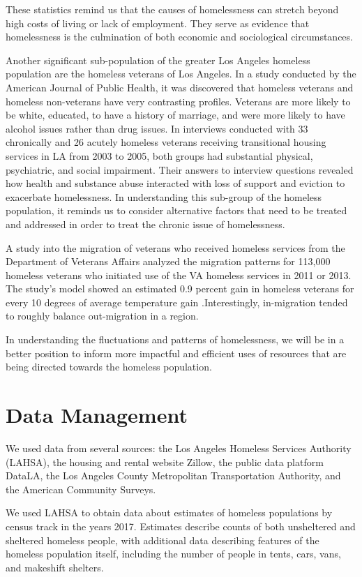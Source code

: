 \documentclass[11pt,letterpaper]{article}
\begin{document}
These statistics remind us that the causes of homelessness can stretch beyond high costs of living or lack of employment. They serve as evidence that homelessness is the culmination of both economic and sociological circumstances.


Another significant sub-population of the greater Los Angeles homeless population are the homeless veterans of Los Angeles. In a study conducted by the American Journal of Public Health, it was discovered that homeless veterans and homeless non-veterans have very contrasting profiles. Veterans are more likely to be white, educated, to have a history of marriage, and were more likely to have alcohol issues rather than drug issues. In interviews conducted with 33 chronically and 26 acutely homeless veterans receiving transitional housing services in LA from 2003 to 2005, both groups had substantial physical, psychiatric, and social impairment. Their answers to interview questions revealed how health and substance abuse interacted with loss of support and eviction to exacerbate homelessness. In understanding this sub-group of the homeless population, it reminds us to consider alternative factors that need to be treated and addressed in order to treat the chronic issue of homelessness.


A study into the migration of veterans who received homeless services from the Department of Veterans Affairs analyzed the migration patterns for 113,000 homeless veterans who initiated use of the VA homeless services in 2011 or 2013. The study's model showed an estimated 0.9 percent gain in homeless veterans for every 10 degrees of average temperature gain \cite{VA}.Interestingly, in-migration tended to roughly balance out-migration in a region.

In understanding the fluctuations and patterns of homelessness, we will be in a better position to inform more impactful and efficient uses of resources that are being directed towards the homeless population.



\section{Data Management}
We used data from several sources: the Los Angeles Homeless Services Authority (LAHSA),
the housing and rental website Zillow, the public data platform DataLA, the Los Angeles County Metropolitan Transportation Authority, and the American Community Surveys.

We used LAHSA to obtain data about estimates of homeless populations by census track in the years 2017. 
Estimates describe counts of both unsheltered and sheltered homeless people, with additional data describing features of the homeless population itself, including the number of people in tents, cars, vans, and makeshift shelters. 
\end{document}
